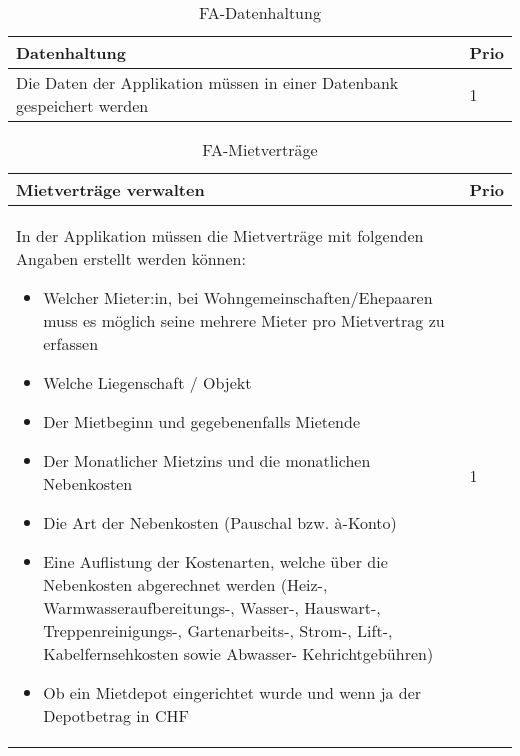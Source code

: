 \begin{table}[H]
  \centering
  \settowidth{}
  \setlength\extrarowheight{2pt}
  \begin{tabulary}{1.0\textwidth}{|m{16cm}|L|}
    \hline
    \textbf{Datenhaltung}&\textbf{Prio}\\
    \hline
      Die Daten der Applikation müssen in einer Datenbank gespeichert werden & 1\\
    \hline
  \end{tabulary}
  \caption{FA-Datenhaltung}
  \label{faDatenhaltung}
\end{table}

\begin{table}[H]
  \centering
  \settowidth{}
  \setlength\extrarowheight{2pt}
  \begin{tabulary}{1.0\textwidth}{|m{16cm}|L|}
    \hline
    \textbf{Mietverträge verwalten}&\textbf{Prio}\\
    \hline
    In der Applikation müssen die Mietverträge mit folgenden Angaben erstellt werden können:
    \begin{itemize}
      \item Welcher Mieter:in, bei Wohngemeinschaften/Ehepaaren muss es möglich seine mehrere Mieter pro Mietvertrag zu erfassen
      \item Welche Liegenschaft / Objekt
      \item Der Mietbeginn und gegebenenfalls Mietende
      \item Der Monatlicher Mietzins und die monatlichen Nebenkosten
      \item Die Art der Nebenkosten (Pauschal bzw. à-Konto)
      \item Eine Auflistung der Kostenarten, welche über die Nebenkosten abgerechnet werden (Heiz-, Warmwasseraufbereitungs-, Wasser-, Hauswart-, Treppenreinigungs-, Gartenarbeits-, Strom-, Lift-, Kabelfernsehkosten sowie Abwasser- Kehrichtgebühren)
      \item Ob ein Mietdepot eingerichtet wurde und wenn ja der Depotbetrag in CHF
    \end{itemize}  & 1\\ 
    \hline
  \end{tabulary}
  \caption{FA-Mietverträge}
  \label{faMietverträge}
\end{table}

